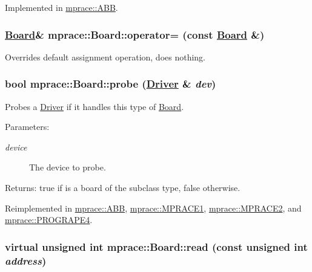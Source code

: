 Implemented in \hyperlink{classmprace_1_1ABB_a3}{mprace::ABB}.\hypertarget{classmprace_1_1Board_b2}{
\subsubsection[operator=]{\setlength{\rightskip}{0pt plus 5cm}\hyperlink{classmprace_1_1Board}{Board}\& mprace::Board::operator= (const \hyperlink{classmprace_1_1Board}{Board} \&)}}
\label{classmprace_1_1Board_b2}


Overrides default assignment operation, does nothing. 

\hypertarget{classmprace_1_1Board_e0}{
\subsubsection[probe]{\setlength{\rightskip}{0pt plus 5cm}bool mprace::Board::probe (\hyperlink{classmprace_1_1Driver}{Driver} \& {\em dev})}}
\label{classmprace_1_1Board_e0}


Probes a \hyperlink{classmprace_1_1Driver}{Driver} if it handles this type of \hyperlink{classmprace_1_1Board}{Board}. 

\begin{Desc}
\item[Parameters:]
\begin{description}
\item[{\em device}]The device to probe. \end{description}
\end{Desc}
\begin{Desc}
\item[Returns:]true if is a board of the subclass type, false otherwise.\end{Desc}


Reimplemented in \hyperlink{classmprace_1_1ABB_e0}{mprace::ABB}, \hyperlink{classmprace_1_1MPRACE1_e0}{mprace::MPRACE1}, \hyperlink{classmprace_1_1MPRACE2_e0}{mprace::MPRACE2}, and \hyperlink{classmprace_1_1PROGRAPE4_e0}{mprace::PROGRAPE4}.\hypertarget{classmprace_1_1Board_a4}{
\subsubsection[read]{\setlength{\rightskip}{0pt plus 5cm}virtual unsigned int mprace::Board::read (const unsigned int {\em address})}}
\label{classmprace_1_1Board_a4}


